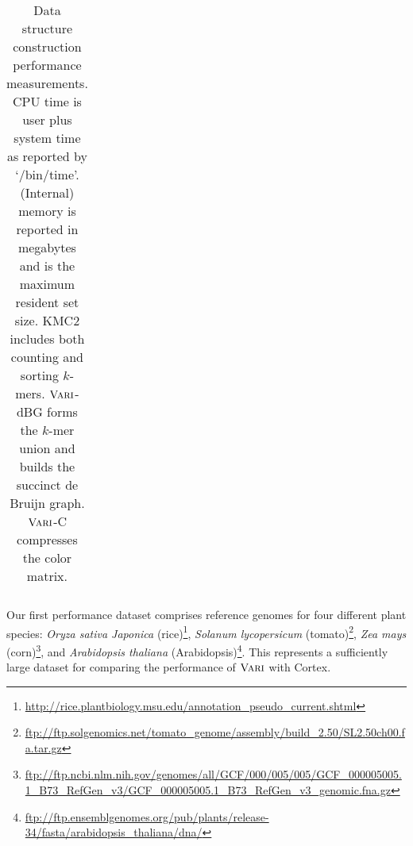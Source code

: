 \begin{table*}
\begin{tabular}{|c|r|r|r|r|r|r|r|r|r|}
    \hline
   \end{tabular}
       \caption{Data structure construction performance measurements.  CPU time is user plus system time as reported by `/bin/time'.  (Internal) memory is reported in megabytes and is the maximum resident set size. KMC2 includes both counting and sorting $k$-mers. $\mbox{\rm {\sc Vari}}$-dBG forms the $k$-mer union and builds the succinct de Bruijn graph. $\mbox{\rm {\sc Vari}}$-C compresses the color matrix.}
  \label{tbl-buildper}

      \end{table*}





    

    

    Our first performance dataset comprises reference genomes for four different plant species:
    \emph{Oryza sativa Japonica} (rice)\footnote{\url{http://rice.plantbiology.msu.edu/annotation_pseudo_current.shtml}}\citep{rice},
    \emph{Solanum lycopersicum} (tomato)\footnote{\url{ftp://ftp.solgenomics.net/tomato_genome/assembly/build_2.50/SL2.50ch00.fa.tar.gz}}\citep{tomato1,tomato2},
    \emph{Zea mays} (corn)\footnote{\url{ftp://ftp.ncbi.nlm.nih.gov/genomes/all/GCF/000/005/005/GCF_000005005.1_B73_RefGen_v3/GCF_000005005.1_B73_RefGen_v3_genomic.fna.gz}}\citep{corn}, and
    \emph{Arabidopsis thaliana} (Arabidopsis)\footnote{\url{ftp://ftp.ensemblgenomes.org/pub/plants/release-34/fasta/arabidopsis_thaliana/dna/}}\citep{swarbreck}.
    This represents a sufficiently large dataset for comparing the performance of $\mbox{\rm {\sc Vari}}$ with {\sc Cortex}.  

